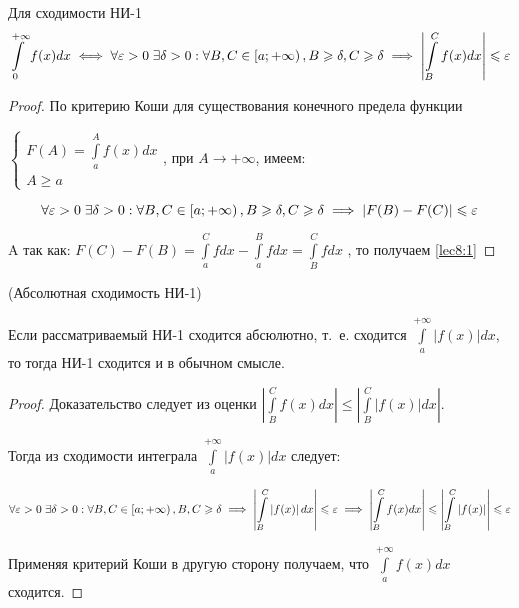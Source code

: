 \documentclass[../../main.tex]{subfiles}
\begin{document}
\begin {thm}
Для сходимости НИ-1
 \begin{equation} \label{lec8:1}
  \int\limits_{0}^{+\infty} f(x)dx \iff \forall \varepsilon > 0 \;  \exists \delta > 
  0 : \forall B, C \in \left[a; +\infty\right), B \geqslant \delta, C \geqslant \delta 
  \implies \left| \int\limits_{B}^{C} f(x)dx \right| \leqslant \varepsilon
 \end{equation}
\end {thm}

\begin{proof}
По критерию Коши для существования конечного предела функции
 
$\begin{cases}
  F(A) = \displaystyle\int\limits_{a}^{A}f(x)dx\\
  A \geq a
 \end{cases}$, при $A \to +\infty$, имеем:
 
 \[\forall \varepsilon > 0 \; \exists \delta > 0 : \forall B, C \in \left[a; +\infty 
 \right), B \geqslant \delta, C \geqslant \delta \implies \left|F(B) - F(C) \right| \leqslant 
 \varepsilon\]
 
 A так как:
 $F(C) - F(B) = \displaystyle\int\limits_{a}^{C}fdx - 
 \displaystyle\int\limits_{a}^{B}fdx = \int\limits_{B}^{C}fdx$
 , то получаем \eqref{lec8:1}
\end{proof}

\begin{crl}
 (Абсолютная сходимость НИ-1)
 
 Если рассматриваемый НИ-1 сходится абсюлютно, т.~е. сходится
 $\displaystyle\int\limits_{a}^{+\infty}|f(x)|dx$, то тогда НИ-1 сходится и в 
 обычном смысле.
 
 \begin{proof}
 Доказательство следует из оценки
$\left|\displaystyle\int\limits_{B}^{C}f(x)dx \right| \leq 
\left|\displaystyle\int\limits_{B}^{C}|f(x)|dx \right|$.

Тогда из сходимости интеграла $\displaystyle\int\limits_{a}^{+\infty}\left| 
f(x) \right| dx $ следует:

\[\forall \varepsilon > 0 \; \exists \delta > 0 : \forall B, C \in \left[a; +\infty 
\right), B, C \geqslant \delta \implies \left| \int\limits_{B}^{C} \left| f(x) 
\right| dx \right| \leqslant \varepsilon \implies \left| \int\limits_{B}^{C} f(x) dx 
\right| \leqslant \left|\int\limits_{B}^{C} \left| f(x) \right| \right| \leqslant \varepsilon\]

Применяя критерий Коши в другую сторону получаем, что 
$\displaystyle\int\limits_{a}^{+\infty}f(x)dx$ сходится.

 \end{proof}    
\end{crl}
\end{document}
